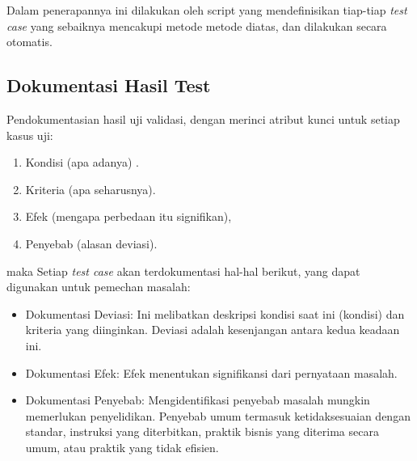 \documentclass[12pt]{article}
\begin{document}
Dalam penerapannya ini dilakukan oleh script yang mendefinisikan tiap-tiap \emph{test case} yang sebaiknya mencakupi metode metode diatas, dan dilakukan secara otomatis.



\subsection*{Dokumentasi Hasil Test}
Pendokumentasian hasil uji validasi, dengan merinci atribut kunci untuk setiap kasus uji: 

\begin{enumerate}
   \item Kondisi (apa adanya) .
   \item Kriteria (apa seharusnya). 
   \item Efek (mengapa perbedaan itu signifikan), 
   \item Penyebab (alasan deviasi). 
   
\end{enumerate}
maka Setiap \emph{test case} akan terdokumentasi hal-hal berikut, yang dapat digunakan untuk pemechan masalah:
\begin{itemize}
   
   \item Dokumentasi Deviasi:  Ini melibatkan deskripsi kondisi saat ini (kondisi) dan kriteria yang diinginkan. Deviasi adalah kesenjangan antara kedua keadaan ini.
   
   \item Dokumentasi Efek: Efek menentukan signifikansi dari pernyataan masalah.
   
   \item Dokumentasi Penyebab: Mengidentifikasi penyebab masalah mungkin memerlukan penyelidikan. Penyebab umum termasuk ketidaksesuaian dengan standar, instruksi yang diterbitkan, praktik bisnis yang diterima secara umum, atau praktik yang tidak efisien.
   
\end{itemize}
\end{document}

